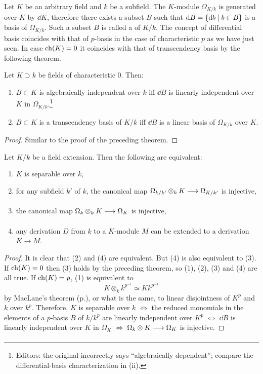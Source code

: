\documentclass[../main]{subfiles}
\begin{document}
\newparagraph
Let $K$ be an arbitrary field and $k$ be a subfield. The $K$-module $\Omega_{K/k}$ is generated over $K$ by $\dd{K}$, therefore there exists a subset $B$ such that \newline $\mathrm{d}B = \left\{\mathrm{d}b \mid b \in B\right\}$ is a basis of $\Omega_{K/k}$. Such a subset $B$ is called a  of $K/k$. The concept of differential basis coincides with that of $p$-basis in the case of characteristic $p$ as we have just seen. In case $\operatorname{ch}(K) = 0$ it coincides with that of transcendency
basis by the following theorem. 
\begin{theorem}
\label{thm:087}
    Let $K\supset k$ be fields of characteristic 0. Then:
    \begin{enumerate}
    \item[(i)] $B\subset K$ is algebraically independent over $k$ iff $\dd{B}$ is linearly independent over $K$ in $\Omega_{K/k}$,\footnote{Editors: the original incorrectly says ``algebraically dependent''; compare the differential-basis characterization in (ii).}
    \item[(ii)] $B\subset K$ is a transcendency basis of $K/k$ iff $\dd{B}$ is a linear basis of $\Omega_{K/k}$ over $K$.
\end{enumerate}
\end{theorem}
\begin{proof}
    Similar to the proof of the preceding theorem.
\end{proof}
\begin{partheorem}
\label{thm:088}
    Let $K/k$ be a field extension. Then the following are equivalent:
    \begin{enumerate}
    \item[(1)] $K$ is separable over $k$,
    \item[(2)] for any subfield $k'$ of $k$, the canonical map $\Omega_{k/k'}\otimes_k K\varrightarrow{} \Omega_{K/k'}$ is injective,
    \item[(3)] the canonical map $\Omega_k \otimes_k K \varrightarrow{} \Omega_K$ is injective,
    \item[(4)] any derivation $D$ from $k$ to a $K$-module $M$ can be extended to a derivation $K \longrightarrow M$. 
    \end{enumerate}
\end{partheorem}
\begin{proof}
    It is clear that (2) and (4) are equivalent. But (4) is also equivalent to (3). If $\operatorname{ch}(K) = 0$ then (3) holds by the preceding theorem, so (1), (2), (3) and (4) are all true. If $\operatorname{ch}(K) = p$, (1) is equivalent to \[ K\otimes_k k^{p^{-1}}\simeq Kk^{p^{-1}}\] by MacLane's theorem (p.\pageref{exe:27.01}), or what is the same, to linear disjointness of $K^p$ and $k$ over $k^p$. Therefore, $K$ is separable over $k$ $\iff$ the reduced monomials in the elements of a $p$-basis $B$ of $k/k^p$ are linearly independent over $K^p$ $\iff$ $\dd{B}$ is linearly independent over $K$ in $\Omega_K$ $\iff$ $\Omega_k\otimes K \varrightarrow{} \Omega_K$ is injective. 
\end{proof}
\end{document}
